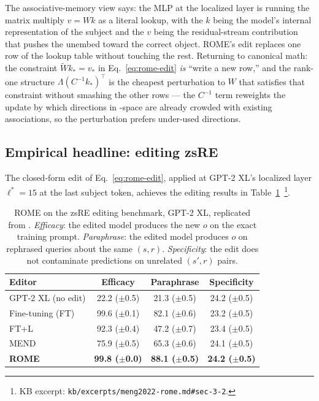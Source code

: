 \begin{intuition}
The associative-memory view says: the MLP at the localized layer is
running the matrix multiply $v = W k$ as a literal lookup, with the
 $k$ being the model's internal representation of the subject and
the  $v$ being the residual-stream contribution that pushes the
unembed toward the correct object. ROME's edit replaces one row of the
lookup table without touching the rest. Returning to canonical math:
the constraint $\tilde{W} k_* = v_*$ in Eq.~\eqref{eq:rome-edit}
\emph{is} ``write a new row,'' and the rank-one structure
$\Lambda (C^{-1} k_*)^{\top}$ is the cheapest perturbation to $W$ that
satisfies that constraint without smashing the other rows --- the
$C^{-1}$ term reweights the update by which directions in -space
are already crowded with existing associations, so the perturbation
prefers under-used directions.
\end{intuition}

\subsection{Empirical headline: editing zsRE}
\label{sec:rome-zsre}

The closed-form edit
of Eq.~\eqref{eq:rome-edit}, applied at GPT-2 XL's localized layer
$\ell^* = 15$ at the last subject token, achieves the editing
results in
Table~\ref{tab:rome-zsre}~\citep[\S 3.2]{meng2022-rome}\footnote{KB
excerpt: \texttt{kb/excerpts/meng2022-rome.md\#sec-3-2}.}.

\begin{table}[h]
\centering
\small
\begin{tabular}{@{}lccc@{}}
\toprule
Editor & Efficacy & Paraphrase & Specificity \\
\midrule
GPT-2 XL (no edit)  & 22.2 (\(\pm\)0.5) & 21.3 (\(\pm\)0.5) & 24.2 (\(\pm\)0.5) \\
Fine-tuning (FT)    & 99.6 (\(\pm\)0.1) & 82.1 (\(\pm\)0.6) & 23.2 (\(\pm\)0.5) \\
FT+L                & 92.3 (\(\pm\)0.4) & 47.2 (\(\pm\)0.7) & 23.4 (\(\pm\)0.5) \\
MEND                & 75.9 (\(\pm\)0.5) & 65.3 (\(\pm\)0.6) & 24.1 (\(\pm\)0.5) \\
\textbf{ROME}       & \textbf{99.8 (\(\pm\)0.0)} & \textbf{88.1 (\(\pm\)0.5)} & \textbf{24.2 (\(\pm\)0.5)} \\
\bottomrule
\end{tabular}
\caption{ROME on the zsRE editing benchmark, GPT-2 XL, replicated from
\citet[\S 3.2]{meng2022-rome}. \emph{Efficacy}: the edited model
produces the new $o$ on the exact training prompt. \emph{Paraphrase}:
the edited model produces $o$ on rephrased queries about the same
$(s, r)$. \emph{Specificity}: the edit does not contaminate predictions
on unrelated $(s', r)$ pairs.}
\label{tab:rome-zsre}
\end{table}

